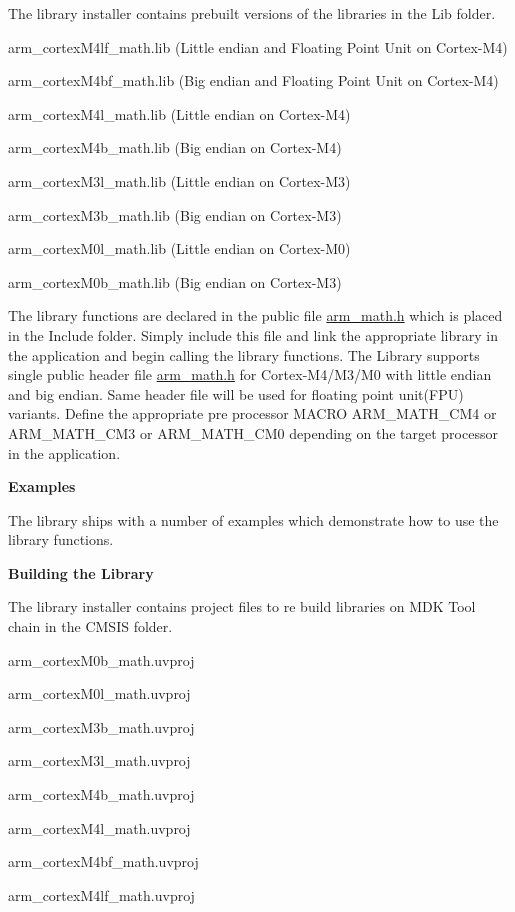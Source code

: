 The library installer contains prebuilt versions of the libraries in the {\ttfamily Lib} folder.
\begin{DoxyItemize}
\item arm\-\_\-cortex\-M4lf\-\_\-math.\-lib (Little endian and Floating Point Unit on Cortex-\/\-M4)
\item arm\-\_\-cortex\-M4bf\-\_\-math.\-lib (Big endian and Floating Point Unit on Cortex-\/\-M4)
\item arm\-\_\-cortex\-M4l\-\_\-math.\-lib (Little endian on Cortex-\/\-M4)
\item arm\-\_\-cortex\-M4b\-\_\-math.\-lib (Big endian on Cortex-\/\-M4)
\item arm\-\_\-cortex\-M3l\-\_\-math.\-lib (Little endian on Cortex-\/\-M3)
\item arm\-\_\-cortex\-M3b\-\_\-math.\-lib (Big endian on Cortex-\/\-M3)
\item arm\-\_\-cortex\-M0l\-\_\-math.\-lib (Little endian on Cortex-\/\-M0)
\item arm\-\_\-cortex\-M0b\-\_\-math.\-lib (Big endian on Cortex-\/\-M3)
\end{DoxyItemize}

The library functions are declared in the public file {\ttfamily \hyperlink{arm__math_8h_source}{arm\-\_\-math.\-h}} which is placed in the {\ttfamily Include} folder. Simply include this file and link the appropriate library in the application and begin calling the library functions. The Library supports single public header file {\ttfamily  \hyperlink{arm__math_8h_source}{arm\-\_\-math.\-h}} for Cortex-\/\-M4/\-M3/\-M0 with little endian and big endian. Same header file will be used for floating point unit(\-F\-P\-U) variants. Define the appropriate pre processor M\-A\-C\-R\-O A\-R\-M\-\_\-\-M\-A\-T\-H\-\_\-\-C\-M4 or A\-R\-M\-\_\-\-M\-A\-T\-H\-\_\-\-C\-M3 or A\-R\-M\-\_\-\-M\-A\-T\-H\-\_\-\-C\-M0 depending on the target processor in the application.

{\bfseries Examples}

The library ships with a number of examples which demonstrate how to use the library functions.

{\bfseries Building the Library}

The library installer contains project files to re build libraries on M\-D\-K Tool chain in the {\ttfamily C\-M\-S\-I\-S} folder.
\begin{DoxyItemize}
\item arm\-\_\-cortex\-M0b\-\_\-math.\-uvproj
\item arm\-\_\-cortex\-M0l\-\_\-math.\-uvproj
\item arm\-\_\-cortex\-M3b\-\_\-math.\-uvproj
\item arm\-\_\-cortex\-M3l\-\_\-math.\-uvproj
\item arm\-\_\-cortex\-M4b\-\_\-math.\-uvproj
\item arm\-\_\-cortex\-M4l\-\_\-math.\-uvproj
\item arm\-\_\-cortex\-M4bf\-\_\-math.\-uvproj
\item arm\-\_\-cortex\-M4lf\-\_\-math.\-uvproj
\end{DoxyItemize}

